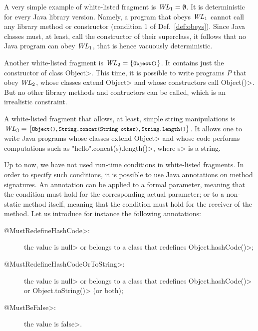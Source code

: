 A very simple example of white-listed fragment is
$\mathit{WL}_1=\emptyset$. It is deterministic for every Java library version.
Namely, a program that obeys $\mathit{WL}_1$ cannot call any library method or constructor
(condition 1 of Def.~\ref{def:obeys}).
Since Java classes must, at least, call the constructor of their superclass, it follows
that no Java program can obey $\mathit{WL}_1$, that is hence vacuously deterministic.

Another white-listed fragment is $\wl_2=\{\<Object()>\}$. It contains
just the constructor of class \<Object>. This time, it is possible to write programs $P$
that obey $\mathit{WL}_2$, whose classes extend \<Object> and whose constructors call \<Object()>.
But no other library methods and contructors can be called, which is an irrealistic
constraint.

A white-listed fragment that allows, at least, simple string manipulations is
$\wl_3=\{\<Object()>,\<String.concat(String other)>,\<String.length()>\}$. It allows one
to write Java programs whose classes extend \<Object> and whose code performs computations
such as \<"hello".concat(s).length()>, where \<s> is a string.

Up to now, we have not used run-time conditions in white-listed fragments.
In order to specify such conditions, it is possible to use Java annotations on
method signatures. An annotation can be applied to a formal parameter, meaning that
the condition must hold for the corresponding actual parameter; or to a non-static method
itself, meaning that the condition must hold for the receiver of the method.
Let us introduce for instance the following annotations:
%
\begin{description}
\item[\<@MustRedefineHashCode>:] the value is \<null> or belongs to a class that redefines
  \<Object.hashCode()>;
\item[\<@MustRedefineHashCodeOrToString>:] the value is \<null> or belongs to a class that redefines
  \<Object.hashCode()> or \<Object.toString()> (or both);
\item[\<@MustBeFalse>:] the value is \<false>.
\end{description}
